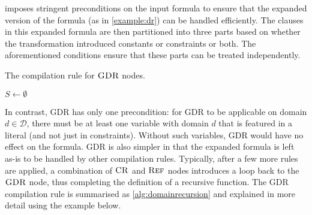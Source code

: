 \citet{DBLP:conf/nips/Broeck11} imposes stringent preconditions on the input
formula to ensure that the expanded version of the formula (as in
\cref{example:dr}) can be handled efficiently. The clauses in this expanded
formula are then partitioned into three parts based on whether the transformation
introduced constants or constraints or both. The aforementioned conditions
ensure that these parts can be treated independently.

\begin{algorithm}[t]
  \caption{The compilation rule for $\operatorname{\textsc{GDR}}$ nodes.}\label{alg:domainrecursion}
  $S \gets \emptyset$\;
\end{algorithm}

In contrast, GDR has only one precondition: for GDR to be applicable on domain
$d \in \mathcal{D}$, there must be at least one variable with domain $d$ that is
featured in a literal (and not just in constraints). Without such variables, GDR
would have no effect on the formula. GDR is also simpler in that the expanded
formula is left as-is to be handled by other compilation rules. Typically, after
a few more rules are applied, a combination of $\operatorname{\textsc{CR}}$ and $\operatorname{\textsc{Ref}}$ nodes
introduces a loop back to the $\operatorname{\textsc{GDR}}$ node, thus completing the definition of a
recursive function. The GDR compilation rule is summarised as
\cref{alg:domainrecursion} and explained in more detail using the example below.


